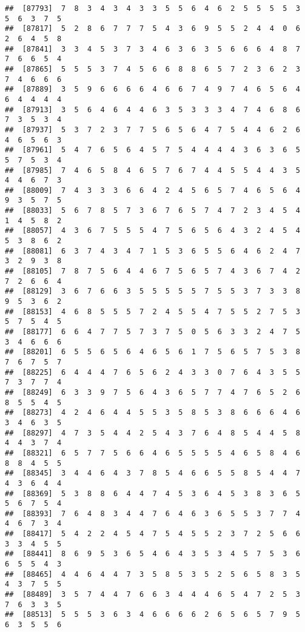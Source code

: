 \documentclass[
]{book}
\begin{document}
\begin{verbatim}
##  [87793]  7  8  3  4  3  4  3  3  5  5  6  4  6  2  5  5  5  5  3  5  6  3  7  5
##  [87817]  5  2  8  6  7  7  7  5  4  3  6  9  5  5  2  4  4  0  6  2  6  4  5  8
##  [87841]  3  3  4  5  3  7  3  4  6  3  6  3  5  6  6  6  4  8  7  7  6  6  5  4
##  [87865]  5  5  5  3  7  4  5  6  6  8  8  6  5  7  2  3  6  2  3  7  4  6  6  6
##  [87889]  3  5  9  6  6  6  6  4  6  6  7  4  9  7  4  6  5  6  4  6  4  4  4  4
##  [87913]  3  5  6  4  6  4  4  6  3  5  3  3  3  4  7  4  6  8  6  7  3  5  3  4
##  [87937]  5  3  7  2  3  7  7  5  6  5  6  4  7  5  4  4  6  2  6  4  6  5  6  3
##  [87961]  5  4  7  6  5  6  4  5  7  5  4  4  4  4  3  6  3  6  5  5  7  5  3  4
##  [87985]  7  4  6  5  8  4  6  5  7  6  7  4  4  5  5  4  4  3  5  4  4  6  7  3
##  [88009]  7  4  3  3  3  6  6  4  2  4  5  6  5  7  4  6  5  6  4  9  3  5  7  5
##  [88033]  5  6  7  8  5  7  3  6  7  6  5  7  4  7  2  3  4  5  4  1  4  5  8  2
##  [88057]  4  3  6  7  5  5  5  4  7  5  6  5  6  4  3  2  4  5  4  5  3  8  6  2
##  [88081]  6  3  7  4  3  4  7  1  5  3  6  5  5  6  4  6  2  4  7  3  2  9  3  8
##  [88105]  7  8  7  5  6  4  4  6  7  5  6  5  7  4  3  6  7  4  2  7  2  6  6  4
##  [88129]  3  6  7  6  6  3  5  5  5  5  5  7  5  5  3  7  3  3  8  9  5  3  6  2
##  [88153]  4  6  8  5  5  5  7  2  4  5  5  4  7  5  5  2  7  5  3  5  7  5  4  5
##  [88177]  6  6  4  7  7  5  7  3  7  5  0  5  6  3  3  2  4  7  5  3  4  6  6  6
##  [88201]  6  5  5  6  5  6  4  6  5  6  1  7  5  6  5  7  5  3  8  7  6  7  5  7
##  [88225]  6  4  4  4  7  6  5  6  2  4  3  3  0  7  6  4  3  5  5  7  3  7  7  4
##  [88249]  6  3  3  9  7  5  6  4  3  6  5  7  7  4  7  6  5  2  6  8  5  5  4  5
##  [88273]  4  2  4  6  4  4  5  5  3  5  8  5  3  8  6  6  6  4  6  3  4  6  3  5
##  [88297]  4  7  3  5  4  4  2  5  4  3  7  6  4  8  5  4  4  5  8  4  4  3  7  4
##  [88321]  6  5  7  7  5  6  6  4  6  5  5  5  5  4  6  5  8  4  6  8  8  4  5  5
##  [88345]  3  4  4  6  4  3  7  8  5  4  6  6  5  5  8  5  4  4  7  4  3  6  4  4
##  [88369]  5  3  8  8  6  4  4  7  4  5  3  6  4  5  3  8  3  6  5  5  6  7  5  4
##  [88393]  7  6  4  8  3  4  4  7  6  4  6  3  6  5  5  3  7  7  4  4  6  7  3  4
##  [88417]  5  4  2  2  4  5  4  7  5  4  5  5  2  3  7  2  5  6  6  3  3  4  5  5
##  [88441]  8  6  9  5  3  6  5  4  6  4  3  5  3  4  5  7  5  3  6  6  5  5  4  3
##  [88465]  4  4  6  4  4  7  3  5  8  5  3  5  2  5  6  5  8  3  5  4  3  7  5  5
##  [88489]  3  5  7  4  4  7  6  6  3  4  4  4  6  5  4  7  2  5  3  7  6  3  3  5
##  [88513]  5  5  5  3  6  3  4  6  6  6  6  2  6  5  6  5  7  9  5  6  3  5  5  6

\end{verbatim}
\end{document}
